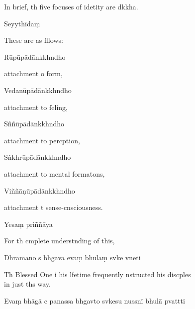 \begin{english}
  In brief, th five focuses of idetity are dkkha.
\end{english}

Seyythīdaṃ

\begin{english}
  These are as fllows:
\end{english}

Rūpūpādānkkhndho

\begin{english}
  attachment o form,
\end{english}

Vedanūpādānkkhndho

\begin{english}
  attachment to feling,
\end{english}

Sññūpādānkkhndho

\begin{english}
  attachment to percption,
\end{english}

Sṅkhrūpādānkkhndho

\begin{english}
  attachment to mental formatons,
\end{english}

Viññāṇūpādānkkhndho

\begin{english}
  attachment t sense-cnsciousness.
\end{english}

Yesaṃ priññāya

\begin{english}
  For th cmplete understnding of this,
\end{english}

Dhramāno s bhgavā evaṃ bhulaṃ svke vneti

\begin{english}
  Th Blessed One i his lfetime frequently nstructed his discples \\in just ths way.
\end{english}

Evaṃ bhāgā c panassa bhgavto svkesu nussnī bhulā pvattti

